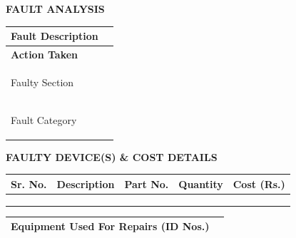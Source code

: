 \documentclass[a4paper,10pt]{article}
\newcommand{\sectiontitle}[1]{
\vspace{2mm}
\colorbox{sectiongray}{
\parbox{\dimexpr\linewidth-2\fboxsep}{
\textbf{\large #1}
}}
\vspace{1mm}
}
\begin{document}

\sectiontitle{FAULT ANALYSIS}

\begin{tabularx}{\textwidth}{|>{\bfseries}l|X|}
\hline

Fault Description &
\\[5mm]
\hline

Action Taken &
\\[5mm]
\hline

Faulty Section &
\\
\hline

Fault Category &
\\
\hline

\end{tabularx}


\sectiontitle{FAULTY DEVICE(S) \& COST DETAILS}

\begin{tabularx}{\textwidth}
{|c|X|c|c|c|}
\hline

\textbf{Sr. No.}
&
\textbf{Description}
&
\textbf{Part No.}
&
\textbf{Quantity}
&
\textbf{Cost (Rs.)}

\\
\hline

& & & & \\
\hline

& & & & \\
\hline

& & & & \\
\hline

\end{tabularx}


\vspace{2mm}

\begin{tabularx}{\textwidth}{|>{\bfseries}l|X|}
\hline

Equipment Used For Repairs (ID Nos.)

&
\\

\hline

\end{tabularx}
\end{document}
